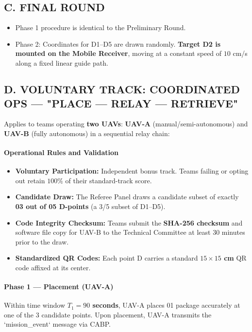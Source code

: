 \documentclass[12pt,a4paper]{article}
\begin{document}
\subsection*{C. FINAL ROUND}
\begin{itemize}
\item Phase 1 procedure is identical to the Preliminary Round.
\item Phase 2: Coordinates for D1–D5 are drawn randomly. \textbf{Target D2 is mounted on the Mobile Receiver}, moving at a constant speed of $10$ cm/s along a fixed linear guide path.
\end{itemize}

\subsection*{D. VOLUNTARY TRACK: COORDINATED OPS — "PLACE — RELAY — RETRIEVE"}

Applies to teams operating \textbf{two UAVs}: \textbf{UAV-A} (manual/semi-autonomous) and \textbf{UAV-B} (fully autonomous) in a sequential relay chain:

\paragraph{Operational Rules and Validation}
\begin{itemize}
\item \textbf{Voluntary Participation:} Independent bonus track. Teams failing or opting out retain $100\%$ of their standard-track score.
\item \textbf{Candidate Draw:} The Referee Panel draws a candidate subset of exactly \textbf{03 out of 05 D-points} (a 3/5 subset of D1–D5).
\item \textbf{Code Integrity Checksum:} Teams submit the \textbf{SHA-256 checksum} and software file copy for UAV-B to the Technical Committee at least 30 minutes prior to the draw.
\item \textbf{Standardized QR Codes:} Each point D carries a standard \textbf{$15 \times 15$ cm} QR code affixed at its center.
\end{itemize}

\paragraph{Phase 1 — Placement (UAV-A)}
Within time window \textbf{$T_1 = 90$ seconds}, UAV-A places 01 package accurately at one of the 3 candidate points. Upon placement, UAV-A transmits the `mission\_event` message via CABP.
\end{document}
